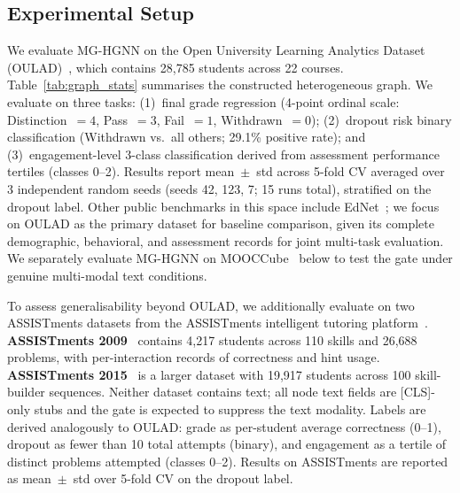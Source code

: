 \documentclass[sigconf,review]{acmart}
\begin{document}
\subsection{Experimental Setup}
\label{sec:setup}
We evaluate MG-HGNN on the Open University Learning
Analytics Dataset (OULAD)~\citep{kuzilek2017open},
which contains 28,785 students across 22 courses.
Table~\ref{tab:graph_stats} summarises the constructed
heterogeneous graph.
We evaluate on three tasks:
(1)~final grade regression (4-point ordinal scale:
Distinction~$= 4$, Pass~$= 3$, Fail~$= 1$,
Withdrawn~$= 0$);
(2)~dropout risk binary classification
(Withdrawn vs.\ all others; 29.1\% positive rate);
and (3)~engagement-level 3-class classification
derived from assessment performance tertiles
(classes 0--2).
Results report mean~$\pm$~std across 5-fold CV
averaged over 3 independent random seeds (seeds
42, 123, 7; 15 runs total), stratified on
the dropout label. Other public benchmarks in this
space include EdNet~\citep{choi2020ednet}; we focus
on OULAD as the primary dataset for baseline
comparison, given its complete demographic,
behavioral, and assessment records for joint
multi-task evaluation. We separately evaluate MG-HGNN
on MOOCCube~\citep{yu2020mooccube} below to test the
gate under genuine multi-modal text conditions.

To assess generalisability beyond OULAD, we additionally
evaluate on two ASSISTments datasets from the ASSISTments
intelligent tutoring platform~\citep{feng2009assistments,assistments2015}.
\textbf{ASSISTments 2009}~\citep{feng2009assistments}
contains 4,217 students across 110 skills and 26,688
problems, with per-interaction records of correctness and
hint usage. \textbf{ASSISTments 2015}~\citep{assistments2015}
is a larger dataset with 19,917 students across 100
skill-builder sequences.
Neither dataset contains text; all node text fields are
[CLS]-only stubs and the gate is expected to suppress the
text modality. Labels are derived analogously to OULAD:
grade as per-student average correctness (0--1),
dropout as fewer than 10 total attempts (binary),
and engagement as a tertile of distinct problems attempted
(classes 0--2). Results on ASSISTments are reported as
mean~$\pm$~std over 5-fold CV on the dropout label.
\end{document}
